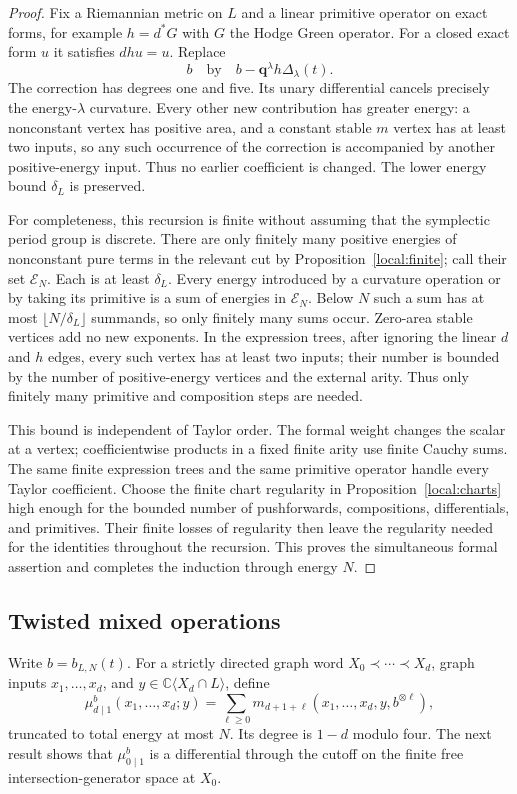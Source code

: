 \documentclass[11pt]{article}
\theoremstyle{definition}
\theoremstyle{remark}
\newcommand{\C}{\mathbb C}
\newcommand{\qnov}{\mathbf q}
\numberwithin{equation}{section}
\begin{document}
\begin{proof}
Fix a Riemannian metric on $L$ and a linear primitive
operator on exact forms, for example $h=d^*G$ with $G$ the
Hodge Green operator.  For a closed exact form $u$ it
satisfies $dhu=u$.  Replace
\[
 b\quad\text{by}\quad b-\qnov^\lambda h\Delta_\lambda(t).
\]
The correction has degrees one and five.  Its unary
differential cancels precisely the energy-$\lambda$
curvature.  Every other new contribution has greater
energy: a nonconstant vertex has positive area, and a
constant stable $m$ vertex has at least two inputs, so any
such occurrence of the correction is accompanied by
another positive-energy input.  Thus no earlier coefficient
is changed.  The lower energy bound $\delta_L$ is preserved.

For completeness, this recursion is finite without assuming
that the symplectic period group is discrete.  There are
only finitely many positive energies of nonconstant pure
terms in the relevant cut by Proposition~\ref{local:finite};
call their set $\mathcal E_N$.  Each is at least
$\delta_L$.  Every energy introduced by a curvature
operation or by taking its primitive is a sum of energies
in $\mathcal E_N$.  Below $N$ such a sum has at most
$\lfloor N/\delta_L\rfloor$ summands, so only finitely many
sums occur.  Zero-area stable vertices add no new
exponents.  In the expression trees, after ignoring the
linear $d$ and $h$ edges, every such vertex has at least two
inputs; their number is bounded by the number of
positive-energy vertices and the external arity.  Thus
only finitely many primitive and composition steps are
needed.

This bound is independent of Taylor order.  The formal
weight changes the scalar at a vertex; coefficientwise
products in a fixed finite arity use finite Cauchy sums.
The same finite expression trees and the same primitive
operator handle every Taylor coefficient.  Choose the
finite chart regularity in Proposition~\ref{local:charts}
high enough for the bounded number of pushforwards,
compositions, differentials, and primitives.  Their finite
losses of regularity then leave the regularity needed for
the identities throughout the recursion.  This proves the
simultaneous formal assertion and completes the induction
through energy $N$.
\end{proof}

\subsection{Twisted mixed operations}

Write $b=b_{L,N}(t)$.  For a strictly directed graph word
$X_0\prec\cdots\prec X_d$, graph inputs $x_1,\ldots,x_d$,
and $y\in\C\langle X_d\cap L\rangle$, define
\begin{equation}
 \label{obs:module-twist}
 \mu^{b}_{d\mid1}(x_1,\ldots,x_d;y)
 =\sum_{\ell\ge0}m_{d+1+\ell}
       (x_1,\ldots,x_d,y,b^{\otimes\ell}),
\end{equation}
truncated to total energy at most $N$.  Its degree is $1-d$
modulo four.  The next result shows that $\mu^b_{0\mid1}$
is a differential through the cutoff on the finite free
intersection-generator space at $X_0$.
\end{document}
